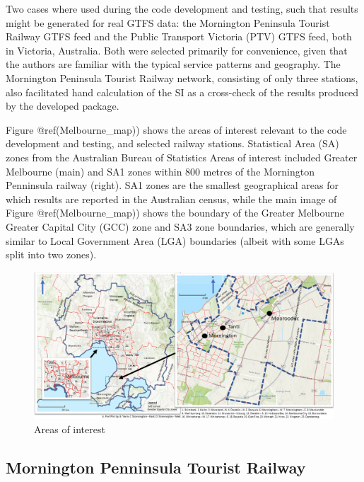 \documentclass[preprint, 3p,
authoryear]{elsarticle} %
\begin{document}
Two cases where used during the code development and testing, such that
results might be generated for real GTFS data: the Mornington Peninsula
Tourist Railway GTFS feed and the Public Transport Victoria (PTV) GTFS
feed, both in Victoria, Australia. Both were selected primarily for
convenience, given that the authors are familiar with the typical
service patterns and geography. The Mornington Peninsula Tourist Railway
network, consisting of only three stations, also facilitated hand
calculation of the SI as a cross-check of the results produced by the
developed package.

Figure @ref(Melbourne\_map)) shows the areas of interest relevant to the
code development and testing, and selected railway stations. Statistical
Area (SA) zones from the Australian Bureau of Statistics \citep{ABSmaps}
Areas of interest included Greater Melbourne (main) and SA1 zones within
800 metres of the Mornington Penninsula railway (right). SA1 zones are
the smallest geographical areas for which results are reported in the
Australian census, while the main image of Figure @ref(Melbourne\_map))
shows the boundary of the Greater Melbourne Greater Capital City (GCC)
zone and SA3 zone boundaries, which are generally similar to Local
Government Area (LGA) boundaries (albeit with some LGAs split into two
zones).

\begin{figure}
\includegraphics[width=1\linewidth]{graphics/all_maps} \caption{Areas of interest}\label{fig:Melbourne_map}
\end{figure}

\hypertarget{mornington-penninsula-tourist-railway}{%
\subsection{Mornington Penninsula Tourist
Railway}\label{mornington-penninsula-tourist-railway}}
\end{document}
